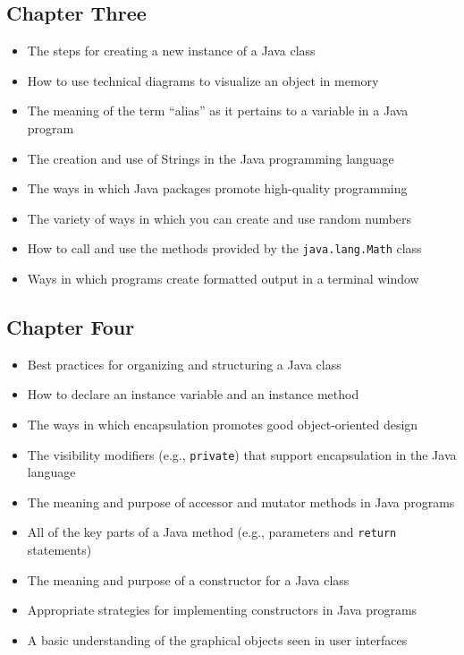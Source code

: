 \documentclass[11pt]{article}
\begin{document}
\subsection*{Chapter Three}

\begin{itemize}

  \item The steps for creating a new instance of a Java class
  \item How to use technical diagrams to visualize an object in memory
  \item The meaning of the term ``alias'' as it pertains to a variable in a Java program
  \item The creation and use of Strings in the Java programming language
  \item The ways in which Java packages promote high-quality programming
  \item The variety of ways in which you can create and use random numbers
  \item How to call and use the methods provided by the {\tt java.lang.Math} class
  \item Ways in which programs create formatted output in a terminal window

\end{itemize}

\subsection*{Chapter Four}

\begin{itemize}

  \item Best practices for organizing and structuring a Java class
  \item How to declare an instance variable and an instance method
  \item The ways in which encapsulation promotes good object-oriented design
  \item The visibility modifiers (e.g., {\tt private}) that support encapsulation in the Java language
  \item The meaning and purpose of accessor and mutator methods in Java programs
  \item All of the key parts of a Java method (e.g., parameters and {\tt return} statements)
  \item The meaning and purpose of a constructor for a Java class
  \item Appropriate strategies for implementing constructors in Java programs
  \item A basic understanding of the graphical objects seen in user interfaces

\end{itemize}
\end{document}
